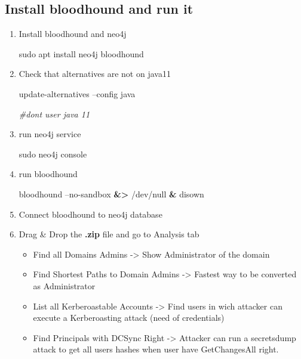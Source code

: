 \documentclass{assets/ipesethesis}
\newenvironment{Shaded}{\begin{snugshade}}{\end{snugshade}}
\newcommand{\BuiltInTok}[1]{#1}
\newcommand{\CommentTok}[1]{\textcolor[rgb]{0.56,0.35,0.01}{\textit{#1}}}
\newcommand{\ExtensionTok}[1]{#1}
\newcommand{\FunctionTok}[1]{\textcolor[rgb]{0.00,0.00,0.00}{#1}}
\newcommand{\KeywordTok}[1]{\textcolor[rgb]{0.13,0.29,0.53}{\textbf{#1}}}
\newcommand{\NormalTok}[1]{#1}
\newcommand{\OperatorTok}[1]{\textcolor[rgb]{0.81,0.36,0.00}{\textbf{#1}}}
\providecommand{\tightlist}{%
  \setlength{\itemsep}{0pt}\setlength{\parskip}{0pt}}
\begin{document}
\hypertarget{install-bloodhound-and-run-it}{%
\subsection*{Install bloodhound and run it}\label{install-bloodhound-and-run-it}}

\begin{enumerate}
\def\labelenumi{\arabic{enumi}.}
\item
  Install bloodhound and neo4j

\begin{Shaded}
\begin{Highlighting}[]
\FunctionTok{sudo}\NormalTok{ apt install neo4j bloodhound}
\end{Highlighting}
\end{Shaded}
\item
  Check that alternatives are not on java11

\begin{Shaded}
\begin{Highlighting}[]
\ExtensionTok{update-alternatives}\NormalTok{ --config java}

\CommentTok{#dont user java 11}
\end{Highlighting}
\end{Shaded}
\item
  run neo4j service

\begin{Shaded}
\begin{Highlighting}[]
\FunctionTok{sudo}\NormalTok{ neo4j console}
\end{Highlighting}
\end{Shaded}
\item
  run bloodhound

\begin{Shaded}
\begin{Highlighting}[]
\ExtensionTok{bloodhound}\NormalTok{ --no-sandbox }\OperatorTok{&>}\NormalTok{ /dev/null }\KeywordTok{&}
\BuiltInTok{disown}
\end{Highlighting}
\end{Shaded}
\item
  Connect bloodhound to neo4j database
\item
  Drag \& Drop the \textbf{.zip} file and go to Analysis tab

  \begin{itemize}
  \tightlist
  \item
    Find all Domains Admins -\textgreater{} Show Administrator of the domain
  \item
    Find Shortest Paths to Domain Admins -\textgreater{} Fastest way to be converted as Administrator
  \item
    List all Kerberoastable Accounts -\textgreater{} Find users in wich attacker can execute a Kerberoasting attack (need of credentials)
  \item
    Find Principals with DCSync Right -\textgreater{} Attacker can run a secretsdump attack to get all users hashes when user have GetChangesAll right.
  \end{itemize}
\end{enumerate}
\end{document}
